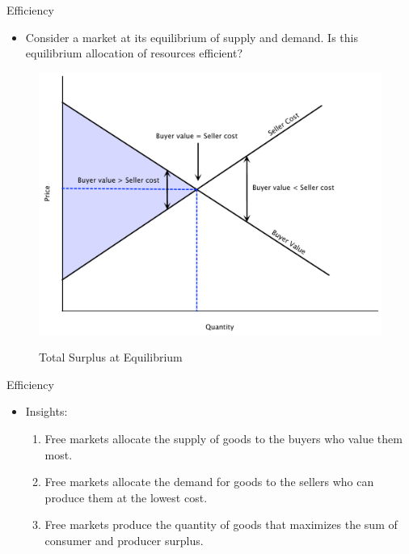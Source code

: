 \documentclass[xcolor={dvipsnames},pdf, hyperref={colorlinks=true, citecolor=ForestGreen, linkcolor=BlueViolet, urlcolor=Magenta}]{beamer}
\newcommand{\blank}[0]{}
\newcommand{\ddp}[1]{{\textcolor{ForestGreen}{#1}}}
\begin{document}
\begin{frame}[t]{Efficiency}
	\begin{itemize}
		\item Consider a market at its equilibrium of supply and demand. Is this equilibrium allocation of resources efficient? 
		\blank\blank\blank\blank\blank
	\end{itemize}
	
	\begin{figure}[H]
		\centering
		\ddp{\includegraphics[scale=.25]{plot21.pdf}}
		\caption{Total Surplus at Equilibrium}
	\end{figure}
	
\end{frame}



\begin{frame}{Efficiency}
	
	\begin{itemize}
		\item Insights: 
		\begin{enumerate}
			\item Free markets allocate the supply of goods to the buyers who value them most.
			\item Free markets allocate the demand for goods to the sellers who can produce them at the lowest cost.
			\item Free markets produce the quantity of goods that maximizes the sum of consumer and producer surplus.
		\end{enumerate}
	\end{itemize}
	
\end{frame}
\end{document}
